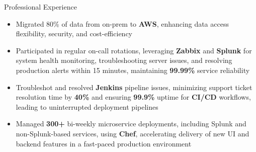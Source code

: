 \documentclass{resume}
\begin{document}
\begin{experienceSection}{Professional Experience}
    \experienceItem[
        company={Cerner Healthcare},
        location={Bangalore, India},
        position={System Engineer - 1},
        duration={May 2021 - Jul 2023}
    ]
    \begin{itemize}
        \itemsep -6pt {}
        \item Migrated 80\% of data from on-prem to \textbf{AWS}, enhancing data access flexibility, security, and cost-efficiency
        \item Participated in regular on-call rotations, leveraging \textbf{Zabbix} and \textbf{Splunk} for system health monitoring, troubleshooting server issues, and resolving production alerts within 15 minutes, maintaining \textbf{99.99\%} service reliability
        \item Troubleshot and resolved \textbf{Jenkins} pipeline issues, minimizing support ticket resolution time by \textbf{40\%} and ensuring \textbf{99.9\%} uptime for \textbf{CI/CD} workflows, leading to uninterrupted deployment pipelines
        \item Managed \textbf{300+} bi-weekly microservice deployments, including Splunk and non-Splunk-based services, using \textbf{Chef}, accelerating delivery of new UI and backend features in a fast-paced production environment
    \end{itemize}

\end{experienceSection}
\end{document}
